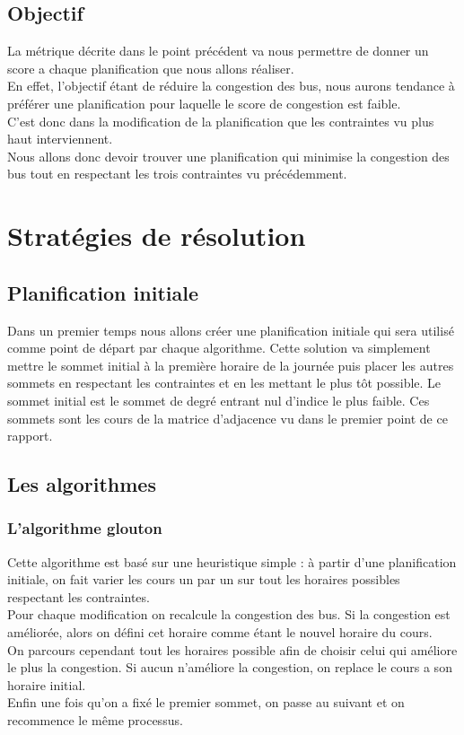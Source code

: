 \documentclass[a4paper,11pt]{article}
\begin{document}
	\subsection{Objectif}
		La métrique décrite dans le point précédent va nous permettre de donner un score a chaque planification que nous allons réaliser.\\
		En effet, l'objectif étant de réduire la congestion des bus, nous aurons tendance à préférer une planification pour laquelle le score de congestion est faible.\\
		C'est donc dans la modification de la planification que les contraintes vu plus haut interviennent.\\
		Nous allons donc devoir trouver une planification qui minimise la congestion des bus tout en respectant les trois contraintes vu précédemment.
	
\section{Stratégies de résolution}
	\subsection{Planification initiale}
		Dans un premier temps nous allons créer une planification initiale qui sera utilisé comme point de départ par chaque algorithme.
		Cette solution va simplement mettre le sommet initial à la première horaire de la journée puis placer les autres sommets en respectant les contraintes et en les mettant le plus tôt possible.
		Le sommet initial est le sommet de degré entrant nul d'indice le plus faible.
		Ces sommets sont les cours de la matrice d'adjacence vu dans le premier point de ce rapport.
	\subsection{Les algorithmes}
		\subsubsection{L'algorithme glouton}
		Cette algorithme est basé sur une heuristique simple : à partir d'une planification initiale, on fait varier les cours un par un sur tout les horaires possibles respectant les contraintes.\\
		Pour chaque modification on recalcule la congestion des bus. Si la congestion est améliorée, alors on défini cet horaire comme étant le nouvel horaire du cours.\\
		On parcours cependant tout les horaires possible afin de choisir celui qui améliore le plus la congestion. Si aucun n'améliore la congestion, on replace le cours a son horaire initial.\\
		Enfin une fois qu'on a fixé le premier sommet, on passe au suivant et on recommence le même processus.
\end{document}
